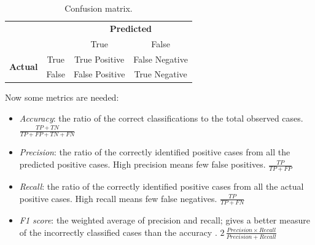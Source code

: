 \begin{table}[ht!]
	\centering
	\begin{tabular}{cccc}
									 &                            & \multicolumn{2}{c}{\textbf{Predicted}} \\
									 & \multicolumn{1}{c|}{}      & True               & False             \\ \cline{2-4} 
	\multirow{2}{*}{\textbf{Actual}} & \multicolumn{1}{c|}{True}  & True Positive      & False Negative    \\
									 & \multicolumn{1}{c|}{False} & False Positive     & True Negative    
	\end{tabular}
	\caption{Confusion matrix.}
\end{table}
Now some metrics are needed:
\begin{itemize}
	\item \textit{Accuracy}: the ratio of the correct classifications to the total observed cases. $\frac{TP+TN}{TP+FP+TN+FN}$
	\item \textit{Precision}: the ratio of the correctly identified positive cases from all the predicted positive cases. High precision means few false positives. $\frac{TP}{TP+FP}$
	\item \textit{Recall}: the ratio of the correctly identified positive cases from all the actual positive cases. High recall means few false negatives. $\frac{TP}{TP+FN}$
	\item \textit{F1 score}: the weighted average of precision and recall; gives a better measure of the incorrectly classified cases than the accuracy \cite{Hui19}. $2\, \frac{Precision \times Recall}{Precision + Recall}$
\end{itemize}
